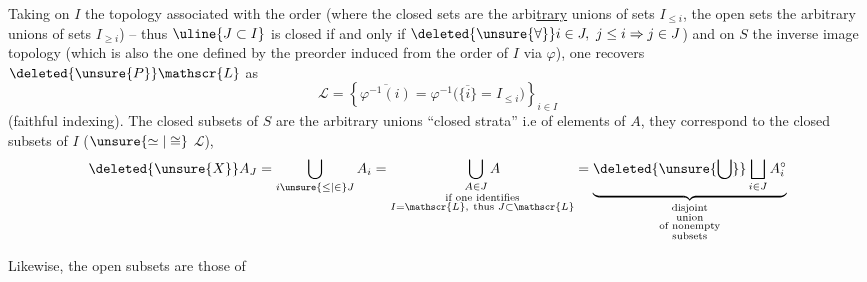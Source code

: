 Taking on $I$ the topology associated with the order (where the closed sets are the arbi\uline{trary} unions of sets $I_{\leq i}$, the open sets the arbitrary unions of sets $I_{\geq i}$) -- thus $\uline{\ensuremath{J\subset I}}$ is closed if and only if $\deleted{\unsure{\forall}}i\in J,\ j\leq i\Rightarrow j\in J$) and on $S$ the inverse image topology (which is also the one defined by the preorder induced from the order of $I$ via $\varphi$),  one recovers $\deleted{\unsure{P}}\mathscr{L}$ as
\[
 \mathscr{L}=\left\{\overline{\varphi^{-1}(i)}=\varphi^{-1}
 \bigl(\overline{\{i\}}=I_{\leq i}\bigr)\right\}_{i\in I}
\]
(faithful indexing). The closed subsets of $S$ are the arbitrary unions  ``closed strata'' i.e of elements of $A$, they correspond  to the closed subsets  of $I$ ($\unsure{\simeq|\cong}$  $\mathscr{L}$),  
\[
\deleted{\unsure{X}}A_J=\bigcup_{i\unsure{\leq|\in}J}A_i
 =\underset{\substack{\text{if one identifies}\\I=\mathscr{L},\ \text{thus }J\subset\mathscr{L}}}{\bigcup_{A\in J} A}
 =\underbrace{\deleted{\unsure{\bigcup}}\bigsqcup_{i\in J}A_i^\circ}_{\substack{\text{disjoint}\\\text{union}\\\text{of nonempty}\\\text{subsets}}}
\]
 

Likewise, the open subsets are those of
